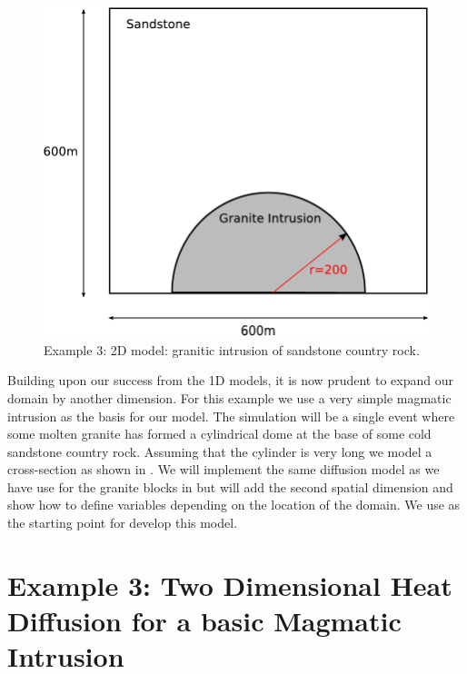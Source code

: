 
%
%
%

\begin{figure}[t]
\centerline{\includegraphics[width=4.in]{figures/twodheatdiff}}
\caption{Example 3: 2D model: granitic intrusion of sandstone country rock.}
\label{fig:twodhdmodel}
\end{figure}


Building upon our success from the 1D models, it is now prudent to expand our
domain by another dimension. 
For this example we use a very simple magmatic intrusion as the basis for our
model. The simulation will be a single event where some molten granite has
formed a cylindrical dome at the base of some cold sandstone country rock.
Assuming that the cylinder is very long 
we model a cross-section as shown in . We will implement
the same 
diffusion model as we have use for the granite blocks in 
but will add the second spatial dimension and show how to define 
variables depending on the location of the domain. 
We use  as the starting point for develop this model. 

\section{Example 3: Two Dimensional Heat Diffusion for a basic Magmatic
Intrusion}
\label{Sec:2DHD}

